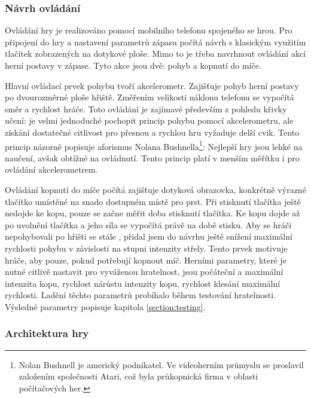 \documentclass[thesis=B,czech,hidelinks]{FITthesis}[2012/06/26] %
\begin{document}
\subsubsection{Návrh ovládání}

Ovládání hry je realizováno pomocí mobilního telefonu spojeného se hrou. Pro připojení do hry a nastavení parametrů zápasu počítá návrh s klasickým využitím tlačítek zobrazených na dotykové ploše. Mimo to je třeba navrhnout ovládání akcí herní postavy v zápase. Tyto akce jsou dvě: pohyb a kopnutí do míče.

Hlavní ovládací prvek pohybu tvoří akcelerometr. Zajišťuje pohyb herní postavy po dvourozměrné ploše hřiště. Změřením velikosti náklonu telefonu se vypočítá směr a rychlost hráče. Toto ovládání je zajímavé především z pohledu křivky učení: je velmi jednoduché pochopit princip pohybu pomocí akcelerometru, ale získání dostatečné citlivost pro přesnou a rychlou hru vyžaduje delší cvik. Tento princip názorně popisuje aforismus Nolana Bushnella\footnote{Nolan Bushnell je americký podnikatel. Ve videoherním průmyslu se proslavil založením společnosti Atari, což byla průkopnická firma v oblasti počítačových her.\cite{atari}}: Nejlepší hry jsou lehké na naučení, avšak obtížné na ovládnutí. \cite{atari} Tento princip platí v menším měřítku i pro ovládání akcelerometrem.

Ovládání kopnutí do míče počítá zajišťuje dotyková obrazovka, konkrétně výrazné tlačítko umístěné na snado dostupném místě pro prst. Při stisknutí tlačítka ještě nedojde ke kopu, pouze se začne měřit doba stisknutí tlačítka. Ke kopu dojde až po uvolnění tlačítka a jeho síla se vypočítá právě na době stisku. Aby se hráči nepohybovali po hřišti se stále , přidal jsem do návrhu ještě snížení maximální rychlosti pohybu v závislosti na stupni intenzity střely. Tento prvek motivuje hráče, aby  pouze, pokud potřebují kopnout míč. Herními parametry, které je nutné citlivě nastavit pro vyváženou hratelnost, jsou počáteční a maximální intenzita kopu, rychlost nárůstu intenzity kopu, rychlost klesání maximální rychlosti. Ladění těchto parametrů probíhalo během testování hratelnosti. Výsledné parametry popisuje kapitola \ref{section:testing}.

\subsubsection{Architektura hry}

\end{document}
